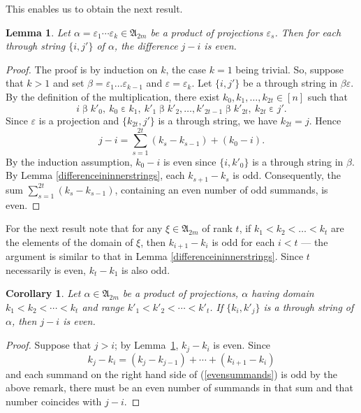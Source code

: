 \documentclass[11pt,reqno]{amsart}
\numberwithin{equation}{section}
\newtheorem{Lemma}[Thm]{Lemma}
\newtheorem{Cor}[Thm]{Corollary}
\theoremstyle{remark}
\def\al{\alpha}
\def\ep{\varepsilon}
\def\be{\beta}
\def\A{\mathfrak{A}}
\begin{document}
This enables us to obtain the next result.

\begin{Lemma}\label{differenceinthroughstrings}
Let $\al=\ep_1\cdots \ep_k\in\A_{2m}$ be a product of projections
$\ep_s$. Then for each through string $\{i,j'\}$ of $\al$, the
difference $j-i$ is even.
\end{Lemma}

\begin{proof}
The proof is by induction on $k$, the case $k=1$ being trivial.
So, suppose that $k>1$ and set $\be=\ep_1\dots\ep_{k-1}$ and
$\ep=\ep_k$. Let $\{i,j'\}$ be a through string in $\be\ep$. By
the definition of the multiplication, there exist
$k_0,k_1,\dots,k_{2t}\in [n]$ such that
$$i\mathrel{\be}k'_0,\ k_0\mathrel{\ep} k_1,\ k'_1\mathrel{\be}
k'_2,\dots ,k'_{2t-1}\mathrel{\be}k'_{2t},\
k_{2t}\mathrel{\ep}j'.$$ Since $\ep$ is a projection and
$\{k_{2t},j'\}$ is a through string, we have $k_{2t}=j$. Hence
$$j-i=\sum_{s=1}^{2t}(k_s-k_{s-1})+(k_0-i).$$
By the induction assumption, $k_0-i$ is even since $\{i,k'_0\}$ is
a through string in $\be$. By Lemma
\ref{differenceininnerstrings}, each $k_{s+1}-k_s$ is odd.
Consequently, the sum $\sum_{s=1}^{2t}(k_{s}-k_{s-1})$, containing
an even number of odd summands, is even.
\end{proof}

For the next result note that for any $\xi\in\A_{2m}$ of rank $t$,
if $k_1<k_2<\dots<k_t$ are the elements of the domain of $\xi$,
then $k_{i+1}-k_i$ is odd for each $i<t$ --- the argument is
similar to that in Lemma \ref{differenceininnerstrings}. Since $t$
necessarily is even, $k_t-k_1$ is also odd.

\begin{Cor}\label{differenceinindices}
Let $\al\in\A_{2m}$ be a product of projections, $\al$ having
domain $k_1<k_2<\cdots<k_t$ and range $k'_1<k'_2<\cdots<k'_t$. If
$\{k_i,k'_j\}$ is a through string of $\al$, then $j-i$ is even.
\end{Cor}

\begin{proof}
Suppose that $j>i$; by Lemma~\ref{differenceinthroughstrings},
$k_j-k_i$ is even. Since
\begin{equation}\label{evensummands}
k_j-k_i=(k_j-k_{j-1})+\cdots+(k_{i+1}-k_i)
\end{equation}
and each summand on the right hand side of (\ref{evensummands}) is
odd by the above remark, there must be an even number of summands
in that sum and that number coincides with $j-i$.
\end{proof}
\end{document}
